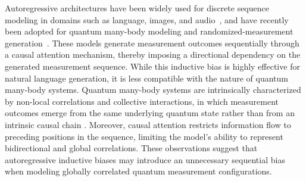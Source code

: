 \documentclass[pdflatex,sn-mathphys-num]{sn-jnl}%
\theoremstyle{thmstyleone}%
\theoremstyle{thmstyletwo}%
\theoremstyle{thmstylethree}%
\begin{document}
Autoregressive architectures have been widely used for discrete sequence modeling in domains such as language, images, and audio~\cite{vaswani2017attention,van2016pixel,van2016wavenet}, and have recently been adopted for quantum many-body modeling and randomized-measurement generation~\cite{sharir2020deep,hibat2020recurrent,yao2024shadowgpt}. These models generate measurement outcomes sequentially through a causal attention mechanism, thereby imposing a directional dependency on the generated measurement sequence. While this inductive bias is highly effective for natural language generation, it is less compatible with the nature of quantum many-body systems. Quantum many-body systems are intrinsically characterized by non-local correlations and collective interactions, in which measurement outcomes emerge from the same underlying quantum state rather than from an intrinsic causal chain \cite{amico2008entanglement}. Moreover, causal attention restricts information flow to preceding positions in the sequence, limiting the model’s ability to represent bidirectional and global correlations. These observations suggest that autoregressive inductive biases may introduce an unnecessary sequential bias when modeling globally correlated quantum measurement configurations.


\end{document}
